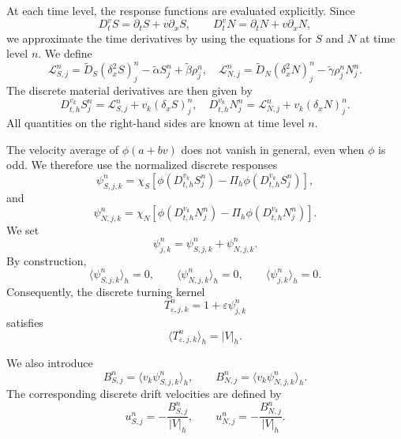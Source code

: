 \documentclass[11pt,twoside]{article}
\theoremstyle{plain}
\theoremstyle{nonumberplain}
\begin{document}
{At each time level, the response functions are evaluated explicitly. Since
\[
D_t^v S=\partial_t S+v\partial_x S,
\qquad
D_t^v N=\partial_t N+v\partial_x N,
\]
we approximate the time derivatives by using the equations for \(S\) and
\(N\) at time level \(n\). We define
\[
\mathcal L_{S,j}^n
=
\widetilde D_S(\delta_x^2 S)_j^n
-\widetilde\alpha S_j^n
+\widetilde\beta \rho_j^n,
\quad 
\mathcal L_{N,j}^n
=
\widetilde D_N(\delta_x^2 N)_j^n
-\widetilde\gamma \rho_j^n N_j^n .
\]
The discrete material derivatives are then given by
\[
D_{t,h}^{v_k}S_j^n
=
\mathcal L_{S,j}^n
+
v_k(\delta_x S)_j^n,
\quad 
D_{t,h}^{v_k}N_j^n
=
\mathcal L_{N,j}^n
+
v_k(\delta_x N)_j^n .
\]
All quantities on the right-hand sides are known at time level \(n\).

The velocity average of \(\phi(a+bv)\) does not vanish in general, even
when \(\phi\) is odd. We therefore use the normalized discrete responses
\[
\psi_{S,j,k}^n
=
\chi_S
\left[
\phi\left(D_{t,h}^{v_k}S_j^n\right)
-
\Pi_h
\phi\left(D_{t,h}^{v_k}S_j^n\right)
\right],
\]
and
\[
\psi_{N,j,k}^n
=
\chi_N
\left[
\phi\left(D_{t,h}^{v_k}N_j^n\right)
-
\Pi_h
\phi\left(D_{t,h}^{v_k}N_j^n\right)
\right].
\]
We set
\[
\psi_{j,k}^n
=
\psi_{S,j,k}^n+\psi_{N,j,k}^n .
\]
By construction,
\[
\langle \psi_{S,j,k}^n\rangle_h=0,
\qquad
\langle \psi_{N,j,k}^n\rangle_h=0,
\qquad
\langle \psi_{j,k}^n\rangle_h=0.
\]
Consequently, the discrete turning kernel
\[
T_{\varepsilon,j,k}^n
=
1+\varepsilon \psi_{j,k}^n
\]
satisfies
\[
\langle T_{\varepsilon,j,k}^n\rangle_h=|V|_h.
\]

We also introduce
\[
B_{S,j}^n
=
\langle v_k\psi_{S,j,k}^n\rangle_h,
\qquad
B_{N,j}^n
=
\langle v_k\psi_{N,j,k}^n\rangle_h.
\]
The corresponding discrete drift velocities are defined by
\[
u_{S,j}^n
=
-\frac{B_{S,j}^n}{|V|_h},
\qquad
u_{N,j}^n
=
-\frac{B_{N,j}^n}{|V|_h}.
\]

}
\end{document}
